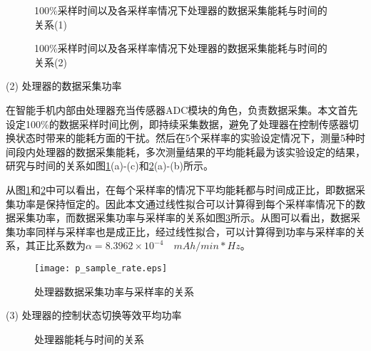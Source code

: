 \begin{figure}[!htb]
    \centering
\caption{100\%采样时间以及各采样率情况下处理器的数据采集能耗与时间的关系(1)}\label{sample1}
\end{figure}
\begin{figure}[htb]
    \centering
    \caption{100\%采样时间以及各采样率情况下处理器的数据采集能耗与时间的关系(2)}\label{sample2}
\end{figure}

	(2) 处理器的数据采集功率
\par 在智能手机内部由处理器充当传感器ADC模块的角色，负责数据采集。本文首先设定100\%的数据采样时间比例，即持续采集数据，避免了处理器在控制传感器切换状态时带来的能耗方面的干扰。然后在5个采样率的实验设定情况下，测量5种时间段内处理器的数据采集能耗，多次测量结果的平均能耗最为该实验设定的结果，研究与时间的关系如图\ref{sample1}(a)-(c)和\ref{sample2}(a)-(b)所示。
\par 从图\ref{sample1}和\ref{sample2}中可以看出，在每个采样率的情况下平均能耗都与时间成正比，即数据采集功率是保持恒定的。因此本文通过线性拟合可以计算得到每个采样率情况下的数据采集功率，而数据采集功率与采样率的关系如图\ref{p_sample_rate}所示。从图可以看出，数据采集功率同样与采样率也是成正比，经过线性拟合，可以计算得到功率与采样率的关系，其正比系数为$\alpha = 8.3962 \times 10^{-4} \quad mAh/min*Hz$。

\begin{figure}[htb]
\centering
\texttt{[image: p\_sample\_rate.eps]}
\caption{处理器数据采集功率与采样率的关系}\label{p_sample_rate}
\end{figure}

	(3) 处理器的控制状态切换等效平均功率
\begin{figure}[htb]
    \centering
    \caption{处理器能耗与时间的关系}\label{on-off}
\end{figure}

